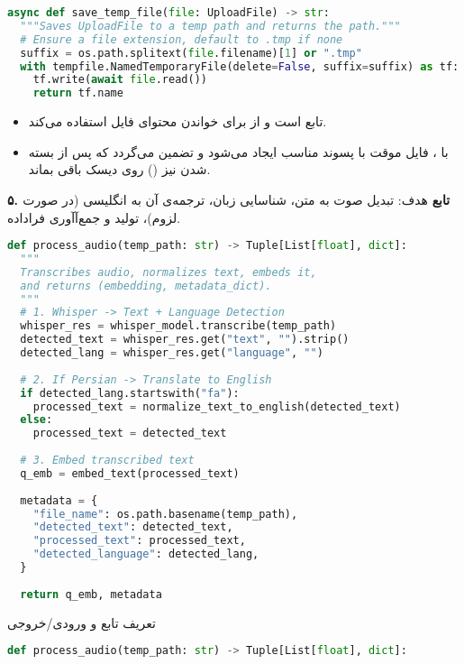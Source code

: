\documentclass{article}
\begin{document}
\begin{latin}
\begin{lstlisting}[language=Python]
async def save_temp_file(file: UploadFile) -> str:
  """Saves UploadFile to a temp path and returns the path."""
  # Ensure a file extension, default to .tmp if none
  suffix = os.path.splitext(file.filename)[1] or ".tmp"
  with tempfile.NamedTemporaryFile(delete=False, suffix=suffix) as tf:
    tf.write(await file.read())
    return tf.name
\end{lstlisting}
\end{latin}

\begin{itemize}
    \item تابع  است و از  برای خواندن محتوای فایل استفاده می‌کند.
    \item با ، فایل موقت با پسوند مناسب ایجاد می‌شود و تضمین می‌گردد که پس از بسته شدن نیز () روی دیسک باقی بماند.
\end{itemize}

\textbf{۵. تابع }
هدف: تبدیل صوت به متن، شناسایی زبان، ترجمه‌ی آن به انگلیسی (در صورت لزوم)، تولید  و جمع‌آآوری فراداده.

\begin{latin}
\begin{lstlisting}[language=Python]
def process_audio(temp_path: str) -> Tuple[List[float], dict]:
  """
  Transcribes audio, normalizes text, embeds it,
  and returns (embedding, metadata_dict).
  """
  # 1. Whisper -> Text + Language Detection
  whisper_res = whisper_model.transcribe(temp_path)
  detected_text = whisper_res.get("text", "").strip()
  detected_lang = whisper_res.get("language", "")
 
  # 2. If Persian -> Translate to English
  if detected_lang.startswith("fa"):
    processed_text = normalize_text_to_english(detected_text)
  else:
    processed_text = detected_text
 
  # 3. Embed transcribed text
  q_emb = embed_text(processed_text)
 
  metadata = {
    "file_name": os.path.basename(temp_path),
    "detected_text": detected_text,
    "processed_text": processed_text,
    "detected_language": detected_lang,
  }
 
  return q_emb, metadata
\end{lstlisting}
\end{latin}


تعریف تابع و ورودی/خروجی
\begin{latin}
\begin{lstlisting}[language=Python]
def process_audio(temp_path: str) -> Tuple[List[float], dict]:
\end{lstlisting}
\end{latin}
\end{document}

